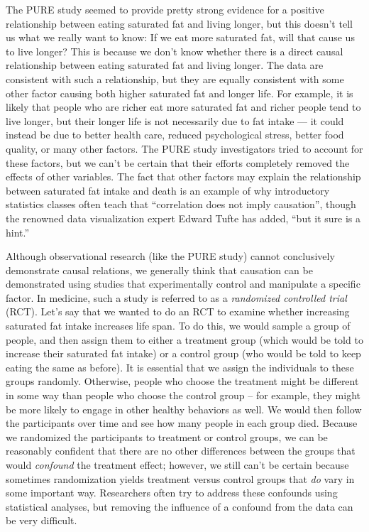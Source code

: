 \documentclass[12pt,]{book}
\theoremstyle{definition}
\theoremstyle{definition}
\theoremstyle{definition}
\theoremstyle{remark}
\begin{document}
The PURE study seemed to provide pretty strong evidence for a positive relationship between eating saturated fat and living longer, but this doesn't tell us what we really want to know: If we eat more saturated fat, will that cause us to live longer? This is because we don't know whether there is a direct causal relationship between eating saturated fat and living longer. The data are consistent with such a relationship, but they are equally consistent with some other factor causing both higher saturated fat and longer life. For example, it is likely that people who are richer eat more saturated fat and richer people tend to live longer, but their longer life is not necessarily due to fat intake --- it could instead be due to better health care, reduced psychological stress, better food quality, or many other factors. The PURE study investigators tried to account for these factors, but we can't be certain that their efforts completely removed the effects of other variables. The fact that other factors may explain the relationship between saturated fat intake and death is an example of why introductory statistics classes often teach that ``correlation does not imply causation'', though the renowned data visualization expert Edward Tufte has added, ``but it sure is a hint.''

Although observational research (like the PURE study) cannot conclusively demonstrate causal relations, we generally think that causation can be demonstrated using studies that experimentally control and manipulate a specific factor. In medicine, such a study is referred to as a \emph{randomized controlled trial} (RCT). Let's say that we wanted to do an RCT to examine whether increasing saturated fat intake increases life span. To do this, we would sample a group of people, and then assign them to either a treatment group (which would be told to increase their saturated fat intake) or a control group (who would be told to keep eating the same as before). It is essential that we assign the individuals to these groups randomly. Otherwise, people who choose the treatment might be different in some way than people who choose the control group -- for example, they might be more likely to engage in other healthy behaviors as well. We would then follow the participants over time and see how many people in each group died. Because we randomized the participants to treatment or control groups, we can be reasonably confident that there are no other differences between the groups that would \emph{confound} the treatment effect; however, we still can't be certain because sometimes randomization yields treatment versus control groups that \emph{do} vary in some important way. Researchers often try to address these confounds using statistical analyses, but removing the influence of a confound from the data can be very difficult.
\end{document}

